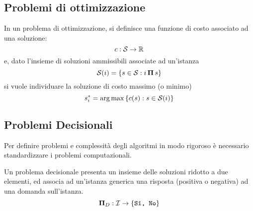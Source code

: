 \subsection{Problemi di ottimizzazione}

In un problema di ottimizzazione, si definisce una funzione di costo associato ad una soluzione:
\begin{equation*}
    c : \mathcal{S}{} \to \mathbb{R}
\end{equation*}
e, dato l'insieme di soluzioni ammissibili associate ad un'istanza
\begin{equation*}
    \mathcal{S}{} (i) = \left\{ s \in \mathcal{S}{} : i \, \bm{\Pi}{} \, s \right\}
\end{equation*}
si vuole individuare la soluzione di costo massimo (o minimo)
\begin{equation*}
    s_{i}^{*} = \operatorname*{arg\,max} \left\{ c(s) : s \in \mathcal{S}{} (i) \right\}
\end{equation*}

\subsection{Problemi Decisionali}

Per definire problemi e complessità degli algoritmi in modo rigoroso è necessario standardizzare i problemi computazionali.

Un problema decisionale presenta un insieme delle soluzioni ridotto a due elementi, ed associa ad un'istanza generica una risposta (positiva o negativa) ad una domanda sull'istanza.
\begin{equation*}
    \bm{\Pi}{}_{D} : \mathcal{I}{} \to \left\{ \texttt{Sì, No} \right\}
\end{equation*}

